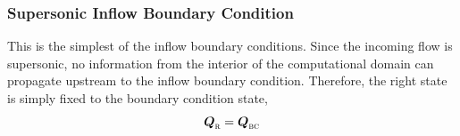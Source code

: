 \subsubsection{Supersonic Inflow Boundary Condition}
\label{SEC:BC:Inflow:Supersonic}

This is the simplest of the inflow boundary conditions.
%
Since the incoming flow is supersonic, no information from the interior of the
computational domain can propagate upstream to the inflow boundary condition.
%
Therefore, the right state is simply fixed to the boundary condition state,
\thatis
%
\begin{equation*}
  \cvVecR = \cvVecBC
\end{equation*}


